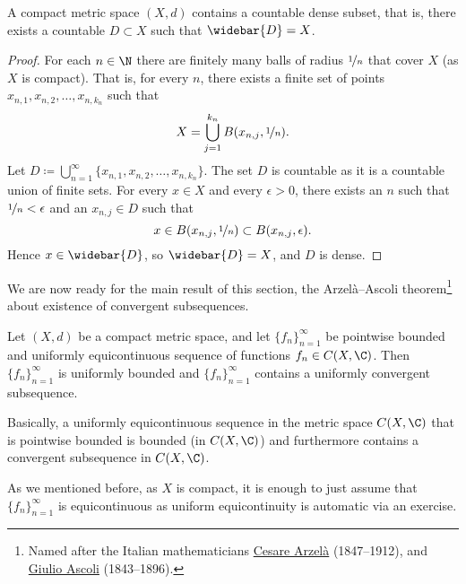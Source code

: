 \begin{prop}
A compact metric space $(X,d)$ contains a countable dense subset,
that is, there exists a countable $D \subset X$ such that $\widebar{D} = X$.
\end{prop}

\begin{proof}
For each $n \in \N$ there are finitely many
balls of radius $\nicefrac{1}{n}$ that cover $X$ (as $X$ is compact). That is,
for every $n$, there exists
a finite set of points $x_{n,1},x_{n,2},\ldots,x_{n,k_n}$ such that
\begin{equation*}
X= \bigcup_{j=1}^{k_n} B(x_{n,j},\nicefrac{1}{n}) .
\end{equation*}
Let $D \coloneqq \bigcup_{n=1}^\infty \{ x_{n,1},x_{n,2},\ldots,x_{n,k_n} \}$.
The set $D$ is countable as it is a countable union of finite sets.
For every $x \in X$
and every $\epsilon > 0$, there exists an $n$ such that
$\nicefrac{1}{n} < \epsilon$ and an $x_{n,j} \in D$ such that
\begin{equation*}
x \in B(x_{n,j},\nicefrac{1}{n}) \subset B(x_{n,j},\epsilon) .
\end{equation*}
Hence $x \in \widebar{D}$, so $\widebar{D} = X$, and $D$ is dense.
\end{proof}

We are now ready for the main result of this section,
the Arzel\`a--Ascoli theorem\footnote{%
Named after the Italian mathematicians
\href{https://en.wikipedia.org/wiki/Cesare_Arzel\%C3\%A0}{Cesare Arzel\`a}
(1847--1912), and
\href{https://en.wikipedia.org/wiki/Giulio_Ascoli}{Giulio Ascoli}
(1843--1896).} about existence of convergent subsequences.

\begin{thm}
\label{thm:arzelaascoli}
Let $(X,d)$ be a compact metric space, and let $\{ f_n \}_{n=1}^\infty$
be pointwise bounded and uniformly equicontinuous sequence
of functions $f_n \in C(X,\C)$.  Then
$\{f_n\}_{n=1}^\infty$ is uniformly bounded and $\{ f_n \}_{n=1}^\infty$ contains a uniformly
convergent subsequence.
\end{thm}

Basically, a uniformly equicontinuous sequence in the metric space
$C(X,\C)$ that is pointwise bounded
is bounded (in $C(X,\C)$) and furthermore contains a convergent
subsequence in $C(X,\C)$.

As we mentioned before, as $X$ is compact, it is enough
to just assume that $\{ f_n \}_{n=1}^\infty$ is equicontinuous as
uniform equicontinuity is automatic via an exercise.

